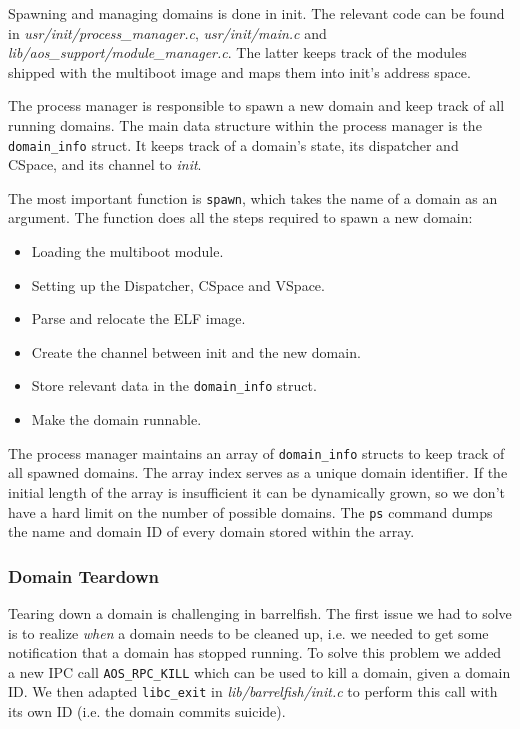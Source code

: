 \documentclass[a4paper,10pt]{article}
\newcommand{\filepath}[1]{\emph{ #1}}
\begin{document}
Spawning and managing domains is done in init.
The relevant code can be found in \filepath{usr/init/process\_manager.c}, \filepath{usr/init/main.c} and \filepath{lib/aos\_support/module\_manager.c}.
The latter keeps track of the modules shipped with the multiboot image and maps them into init's address space.

The process manager is responsible to spawn a new domain and keep track of all running domains.
The main data structure within the process manager is the \lstinline!domain_info! struct.
It keeps track of a domain's state, its dispatcher and CSpace, and its channel to \emph{init}.

The most important function is \lstinline!spawn!, which takes the name of a domain as an argument.
The function does all the steps required to spawn a new domain:
\begin{itemize}
 \item Loading the multiboot module.
 \item Setting up the Dispatcher, CSpace and VSpace.
 \item Parse and relocate the ELF image.
 \item Create the channel between init and the new domain.
 \item Store relevant data in the \lstinline!domain_info! struct.
 \item Make the domain runnable.
\end{itemize}

The process manager maintains an array of \lstinline!domain_info! structs to keep track of all spawned domains.
The array index serves as a unique domain identifier.
If the initial length of the array is insufficient it can be dynamically grown, so we don't have a hard limit on the number of possible domains.
The \lstinline!ps! command dumps the name and domain ID of every domain stored within the array.

\subsubsection {Domain Teardown}

Tearing down a domain is challenging in barrelfish.
The first issue we had to solve is to realize \emph{when} a domain needs to be cleaned up, i.e. we needed to get some notification that a domain has stopped running.
To solve this problem we added a new IPC call \lstinline!AOS_RPC_KILL! which can be used to kill a domain, given a domain ID.
We then adapted \lstinline!libc_exit! in \filepath{lib/barrelfish/init.c} to perform this call with its own ID (i.e. the domain commits suicide).
\end{document}
